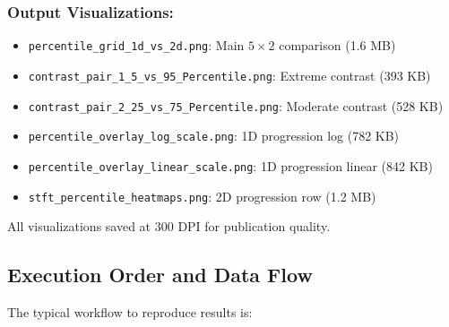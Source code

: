 \subsubsection{Output Visualizations:}
\begin{itemize}
    \item \verb|percentile_grid_1d_vs_2d.png|: Main $5 \times 2$ comparison (1.6 MB)
    \item \verb|contrast_pair_1_5_vs_95_Percentile.png|: Extreme contrast (393 KB)
    \item \verb|contrast_pair_2_25_vs_75_Percentile.png|: Moderate contrast (528 KB)
    \item \verb|percentile_overlay_log_scale.png|: 1D progression log (782 KB)
    \item \verb|percentile_overlay_linear_scale.png|: 1D progression linear (842 KB)
    \item \verb|stft_percentile_heatmaps.png|: 2D progression row (1.2 MB)
\end{itemize}

All visualizations saved at 300 DPI for publication quality.

\subsection{Execution Order and Data Flow}

The typical workflow to reproduce results is:

